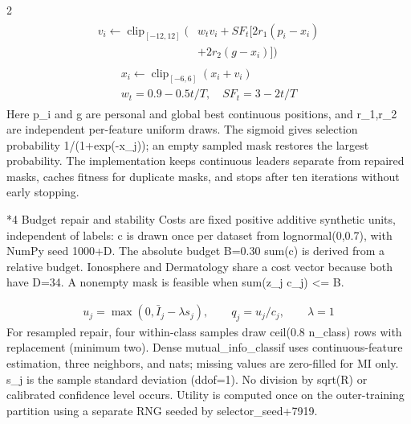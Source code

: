 \documentclass[10pt,a4paper]{article}
\makeatletter
\renewcommand{\section}{\@startsection{section}{1}{0pt}{5pt}{2pt}{\normalfont\normalsize\bfseries}}
\newcommand{\sect}[1]{\section*{#1}}
\makeatother
\begin{document}
\begin{multicols}{2}
\begin{equation}\begin{gathered}\begin{aligned}v_i\leftarrow\operatorname{clip}_{[-12,12]}\big(&w_t v_i+SF_t[2r_1(p_i-x_i)\\&+2r_2(g-x_i)]\big)\end{aligned}\end{gathered}\end{equation}
\begin{equation}\begin{gathered}\begin{gathered}x_i\leftarrow\operatorname{clip}_{[-6,6]}(x_i+v_i)\\w_t=0.9-0.5t/T,\quad SF_t=3-2t/T\end{gathered}\end{gathered}\end{equation}
Here p\_i and g are personal and global best continuous positions, and r\_1,r\_2 are independent per-feature uniform draws. The sigmoid gives selection probability 1/(1+exp(-x\_j)); an empty sampled mask restores the largest probability. The implementation keeps continuous leaders separate from repaired masks, caches fitness for duplicate masks, and stops after ten iterations without early stopping.

\sect{4  Budget repair and stability}
Costs are fixed positive additive synthetic units, independent of labels: c is drawn once per dataset from lognormal(0,0.7), with NumPy seed 1000+D. The absolute budget B=0.30 sum(c) is derived from a relative budget. Ionosphere and Dermatology share a cost vector because both have D=34. A nonempty mask is feasible when sum(z\_j c\_j) <= B.

\begin{equation}\begin{gathered}u_j=\max(0,\bar I_j-\lambda s_j),\qquad q_j=u_j/c_j,\qquad\lambda=1\end{gathered}\end{equation}
For resampled repair, four within-class samples draw ceil(0.8 n\_class) rows with replacement (minimum two). Dense mutual\_info\_classif uses continuous-feature estimation, three neighbors, and nats; missing values are zero-filled for MI only. s\_j is the sample standard deviation (ddof=1). No division by sqrt(R) or calibrated confidence level occurs. Utility is computed once on the outer-training partition using a separate RNG seeded by selector\_seed+7919.


\end{multicols}
\end{document}
